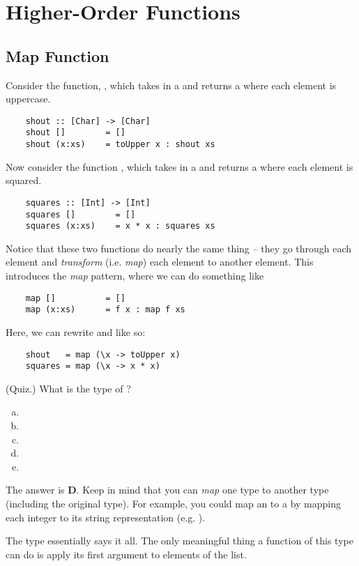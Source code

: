 \documentclass[letterpaper]{article}
\begin{document}
\section{Higher-Order Functions}

\subsection{Map Function}
Consider the function, , which takes in a \code{[Char]} and returns a \code{[Char]} where each element is uppercase. 
\begin{verbatim}
    shout :: [Char] -> [Char]
    shout []        = [] 
    shout (x:xs)    = toUpper x : shout xs\end{verbatim}
Now consider the function , which takes in a \code{[Int]} and returns a \code{[Int]} where each element is squared.
\begin{verbatim}
    squares :: [Int] -> [Int]
    squares []        = [] 
    squares (x:xs)    = x * x : squares xs\end{verbatim}
Notice that these two functions do nearly the same thing -- they go through each element and \emph{transform} (i.e. \emph{map}) each element to another element. This introduces the \emph{map} pattern, where we can do something like 
\begin{verbatim}
    map []          = []
    map (x:xs)      = f x : map f xs\end{verbatim}
Here, we can rewrite  and  like so: 
\begin{verbatim}
    shout   = map (\x -> toUpper x)
    squares = map (\x -> x * x)\end{verbatim}
\begin{mdframed}[]
    (Quiz.) What is the type of ?
    
    \begin{enumerate}[(a)]
        \item {}
        \item {}
        \item {}
        \item {}
        \item {}
    \end{enumerate}

    \begin{mdframed}[]
        The answer is \textbf{D}. Keep in mind that you can \emph{map} one type to another type (including the original type). For example, you could map an \code{[Int]} to a \code{[Char]} by mapping each integer to its string representation (e.g. ).
    \end{mdframed}
\end{mdframed}
The type essentially says it all. The only meaningful thing a function of this type can do is apply its first argument to elements of the list.
\end{document}
